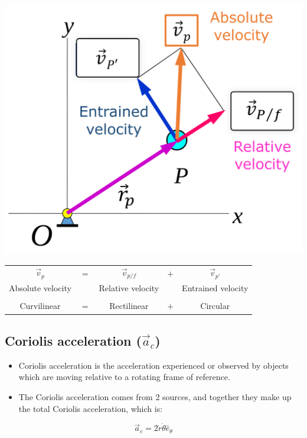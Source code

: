 \documentclass[11pt]{article}
\begin{document}
\begin{center}
\includegraphics[width=.9\linewidth]{./images/different-types-of-velocities-in-curvilinear-motion.png}
\end{center}

\begin{center}
\begin{tabular}{c c c c c}
\(\vec{v}_p\) & \(=\) & \(\vec{v}_{p/f}\) & \(+\) & \(\vec{v}_{p'}\)\\
Absolute velocity &  & Relative velocity &  & Entrained velocity\\
 &  &  &  & \\
Curvilinear & \(=\) & Rectilinear & \(+\) & Circular\\
\end{tabular}
\end{center}

 \newpage
\subsection{Coriolis acceleration (\(\vec{a}_c\))}
\label{sec:orgaee031a}
\begin{itemize}
\item Coriolis acceleration is the acceleration experienced or observed by objects which are moving relative to a rotating frame of reference.
\item The Coriolis acceleration comes from 2 sources, and together they make up the total Coriolis acceleration, which is:
\end{itemize}

\[\vec{a}_c = 2 \dot{r} \dot{\theta} \hat{e}_{\theta}\]
\end{document}
